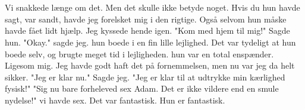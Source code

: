 \documentclass[]{article}
\begin{document}
\\ \\
Vi snakkede længe om det. Men det skulle ikke betyde noget. Hvis du hun havde sagt, var sandt, havde jeg forelsket mig i den rigtige. Også selvom hun måske havde fået lidt hjælp. Jeg kyssede hende igen. "Kom med hjem til mig!" Sagde hun. "Okay." sagde jeg. hun boede i en fin lille lejlighed. Det var tydeligt at hun boede selv, og brugte meget tid i lejligheden. hun var en total enspænder. Ligesom mig. Jeg havde godt haft det på fornemmelsen, men nu var jeg da helt sikker. "Jeg er klar nu." Sagde jeg. "Jeg er klar til at udtrykke min kærlighed fysisk!" "Sig nu bare forheleved sex Adam. Det er ikke vildere end en smule nydelse!" vi havde sex. Det var fantastisk. Hun er fantastisk.
\end{document}
